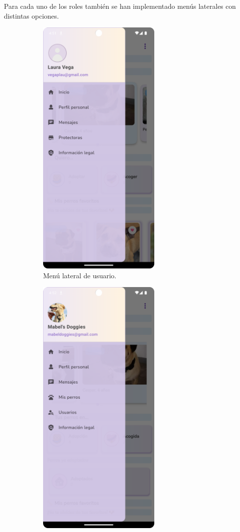 \documentclass[a4paper, 12pt]{article}
\begin{document}
Para cada uno de los roles también se han implementado menús laterales con distintas opciones.

\begin{figure}[H]
   	\begin{subfigure}{0.48\textwidth}
		\begin{center}
			{\includegraphics[width=6cm]{app/UserSideMenu.png}\par}
			\caption{Menú lateral de usuario.}
		\end{center}  
	\end{subfigure}\hfill
   	\begin{subfigure}{0.48\textwidth}
		\begin{center}
			{\includegraphics[width=6cm]{app/CompanySideMenu.png}\par}

\end{center}
\end{subfigure}
\end{figure}
\end{document}
